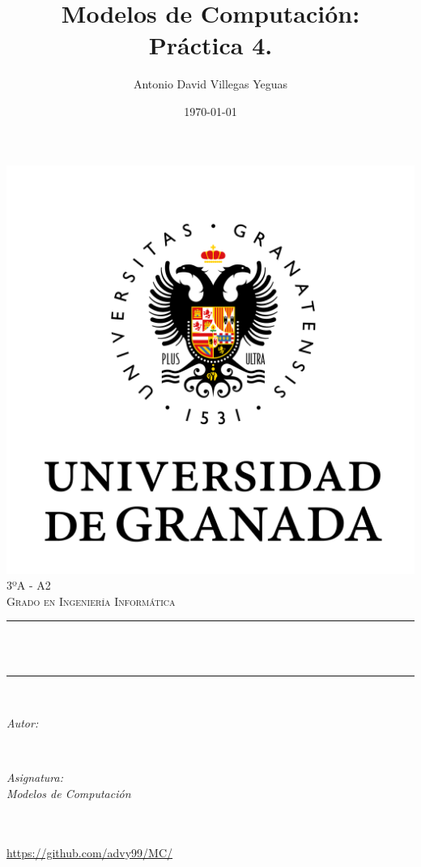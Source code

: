 \documentclass[12pt, spanish]{article}
\title{Modelos de Computación:\\
Práctica 4. \hspace{0.05cm} }
\author{Antonio David Villegas Yeguas}
\date{\today}
\makeatletter
\let\thetitle\@title
\let\theauthor\@author
\let\thedate\@date
\makeatother
\begin{document}

\begin{titlepage}
    \centering
    \vspace*{0.5 cm}
    \includegraphics[scale = 0.50]{ugr.png}\\[1.0 cm]
    \textsc{\large 3ºA - A2}\\[0.5 cm]            
    \textsc{\large Grado en Ingeniería Informática}\\[0.5 cm]              
    \rule{\linewidth}{0.2 mm} \\[0.2 cm]
    { \huge \bfseries \thetitle}\\
    \rule{\linewidth}{0.2 mm} \\[1 cm]
    
    \begin{minipage}{0.4\textwidth}
        \begin{flushleft} \large
            \emph{Autor:}\\
            \theauthor
            \end{flushleft}
            \end{minipage}~
            \begin{minipage}{0.4\textwidth}
            \begin{flushright} \large
            \emph{Asignatura: \\
            Modelos de Computación}                   
        \end{flushright}
    \end{minipage}\\[0.5cm]
  
    {\large \thedate}\\[0.5cm]
    {\url{https://github.com/advy99/MC/}}
    {\doclicenseThis}
 	
    \vfill
    
\end{titlepage}
\end{document}

